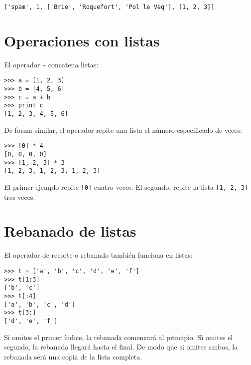 
\beforeverb
\begin{verbatim}
['spam', 1, ['Brie', 'Roquefort', 'Pol le Veq'], [1, 2, 3]]
\end{verbatim}
\afterverb



\section{Operaciones con listas}

El operador {\tt +} concatena listas:


\beforeverb
\begin{verbatim}
>>> a = [1, 2, 3]
>>> b = [4, 5, 6]
>>> c = a + b
>>> print c
[1, 2, 3, 4, 5, 6]
\end{verbatim}
\afterverb
%
De forma similar, el operador {\tt *} repite una lista el número especificado de veces:


\beforeverb
\begin{verbatim}
>>> [0] * 4
[0, 0, 0, 0]
>>> [1, 2, 3] * 3
[1, 2, 3, 1, 2, 3, 1, 2, 3]
\end{verbatim}
\afterverb
%
El primer ejemplo repite {\tt [0]} cuatro veces. El segundo,
repite la lista {\tt [1, 2, 3]} tres veces.


\section{Rebanado de listas}


El operador de recorte o rebanado también funciona en listas:

\beforeverb
\begin{verbatim}
>>> t = ['a', 'b', 'c', 'd', 'e', 'f']
>>> t[1:3]
['b', 'c']
>>> t[:4]
['a', 'b', 'c', 'd']
>>> t[3:]
['d', 'e', 'f']
\end{verbatim}
\afterverb
%
Si omites el primer índice, la rebanada comenzará al principio.
Si omites el segundo, la rebanada llegará hasta el final. De modo que
si omites ambos, la rebanada será una copia de la lista completa.


